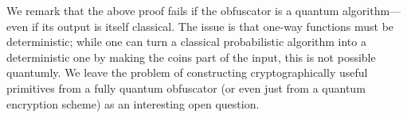 \documentclass[envcountsame]{llncs}
\numberwithin{equation}{section}
\newtheorem{prop}{Proposition}
\newcommand{\algo}{\mathcal}
\newcommand{\KeyGen}{\ensuremath{\mathsf{KeyGen}}\xspace}
\newcommand{\Enc}{\ensuremath{\mathsf{Enc}}\xspace}
\newcommand{\Dec}{\ensuremath{\mathsf{Dec}}\xspace}
\newcommand{\inrand}{\in_R}
\begin{document}
We remark that the above proof fails if the obfuscator is a quantum algorithm---even if its output is itself classical. The issue is that one-way functions must be deterministic; while one can turn a classical probabilistic algorithm into a deterministic one by making the coins part of the input, this is not possible quantumly. We leave the problem of constructing cryptographically useful primitives from a fully quantum obfuscator (or even just from a quantum encryption scheme) as an interesting open question. 

%
%
\end{document}
